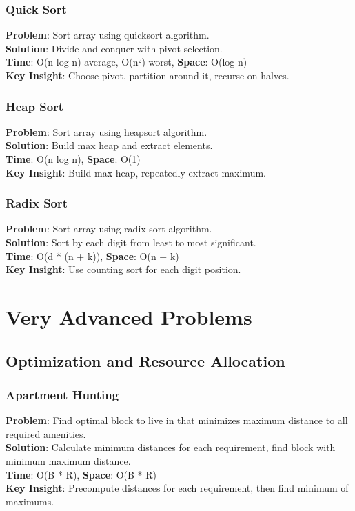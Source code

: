 \documentclass{report}
\begin{document}
\subsection{Quick Sort}
\textbf{Problem}: Sort array using quicksort algorithm.\\
\textbf{Solution}: Divide and conquer with pivot selection.\\
\textbf{Time}: O(n log n) average, O(n²) worst, \textbf{Space}: O(log n)\\
\textbf{Key Insight}: Choose pivot, partition around it, recurse on halves.

\subsection{Heap Sort}
\textbf{Problem}: Sort array using heapsort algorithm.\\
\textbf{Solution}: Build max heap and extract elements.\\
\textbf{Time}: O(n log n), \textbf{Space}: O(1)\\
\textbf{Key Insight}: Build max heap, repeatedly extract maximum.

\subsection{Radix Sort}
\textbf{Problem}: Sort array using radix sort algorithm.\\
\textbf{Solution}: Sort by each digit from least to most significant.\\
\textbf{Time}: O(d * (n + k)), \textbf{Space}: O(n + k)\\
\textbf{Key Insight}: Use counting sort for each digit position.

\chapter{Very Advanced Problems}

\section{Optimization and Resource Allocation}

\subsection{Apartment Hunting}
\textbf{Problem}: Find optimal block to live in that minimizes maximum distance to all required amenities.\\
\textbf{Solution}: Calculate minimum distances for each requirement, find block with minimum maximum distance.\\
\textbf{Time}: O(B * R), \textbf{Space}: O(B * R)\\
\textbf{Key Insight}: Precompute distances for each requirement, then find minimum of maximums.
\end{document}
